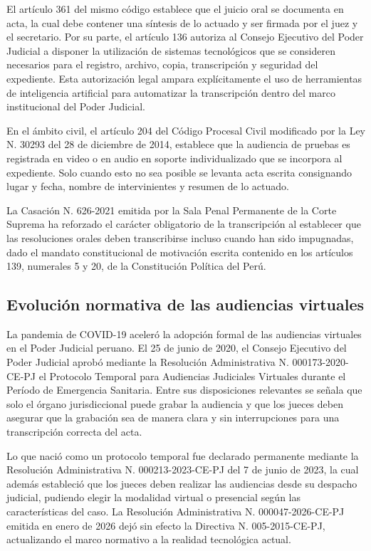 \documentclass[12pt,a4paper,oneside]{article}
\begin{document}
El art\'iculo 361 del mismo c\'odigo establece que el juicio oral se documenta en acta, la cual debe contener una s\'intesis de lo actuado y ser firmada por el juez y el secretario. Por su parte, el art\'iculo 136 autoriza al Consejo Ejecutivo del Poder Judicial a disponer la utilizaci\'on de sistemas tecnol\'ogicos que se consideren necesarios para el registro, archivo, copia, transcripci\'on y seguridad del expediente. Esta autorizaci\'on legal ampara expl\'icitamente el uso de herramientas de inteligencia artificial para automatizar la transcripci\'on dentro del marco institucional del Poder Judicial.

En el \'ambito civil, el art\'iculo 204 del C\'odigo Procesal Civil modificado por la Ley N.\textordmasculine{} 30293 del 28 de diciembre de 2014, establece que la audiencia de pruebas es registrada en video o en audio en soporte individualizado que se incorpora al expediente. Solo cuando esto no sea posible se levanta acta escrita consignando lugar y fecha, nombre de intervinientes y resumen de lo actuado.

La Casaci\'on N.\textordmasculine{} 626-2021 emitida por la Sala Penal Permanente de la Corte Suprema ha reforzado el car\'acter obligatorio de la transcripci\'on al establecer que las resoluciones orales deben transcribirse incluso cuando han sido impugnadas, dado el mandato constitucional de motivaci\'on escrita contenido en los art\'iculos 139, numerales 5 y 20, de la Constituci\'on Pol\'itica del Per\'u.

\subsection{Evoluci\'on normativa de las audiencias virtuales}

La pandemia de COVID-19 aceler\'o la adopci\'on formal de las audiencias virtuales en el Poder Judicial peruano. El 25 de junio de 2020, el Consejo Ejecutivo del Poder Judicial aprob\'o mediante la Resoluci\'on Administrativa N.\textordmasculine{} 000173-2020-CE-PJ el Protocolo Temporal para Audiencias Judiciales Virtuales durante el Per\'iodo de Emergencia Sanitaria. Entre sus disposiciones relevantes se se\~nala que solo el \'organo jurisdiccional puede grabar la audiencia y que los jueces deben asegurar que la grabaci\'on sea de manera clara y sin interrupciones para una transcripci\'on correcta del acta.

Lo que naci\'o como un protocolo temporal fue declarado permanente mediante la Resoluci\'on Administrativa N.\textordmasculine{} 000213-2023-CE-PJ del 7 de junio de 2023, la cual adem\'as estableci\'o que los jueces deben realizar las audiencias desde su despacho judicial, pudiendo elegir la modalidad virtual o presencial seg\'un las caracter\'isticas del caso. La Resoluci\'on Administrativa N.\textordmasculine{} 000047-2026-CE-PJ emitida en enero de 2026 dej\'o sin efecto la Directiva N.\textordmasculine{} 005-2015-CE-PJ, actualizando el marco normativo a la realidad tecnol\'ogica actual.
\end{document}
